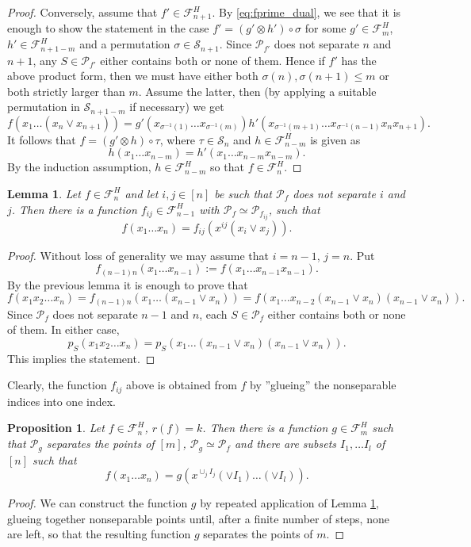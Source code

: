 \documentclass[12pt]{article}
\newtheorem{lemma}{Lemma}
\newtheorem{prop}{Proposition}
\theoremstyle{definition}
\theoremstyle{remark}
\def\perm{\mathcal S}
\def\Pe{\mathcal P}
\def\Fe{\mathcal F}
\begin{document}
\begin{proof}
Conversely, assume that $f'\in \Fe_{n+1}^H$. By \eqref{eq:fprime_dual}, we see that it is
enough to show the statement in the case $f'=(g'\otimes h')\circ \sigma$ for some $g'\in
\Fe_m^H$, $h'\in
\Fe_{n+1-m}^H$ and a permutation $\sigma\in \perm_{n+1}$. Since
$\Pe_{f'}$ does not separate $n$ and $n+1$, any $S\in \Pe_{f'}$
either contains both  or none of them. Hence if $f'$ has the above product form,
then we must have either  both $\sigma(n),\sigma(n+1)\le m$ or both strictly
larger than $m$. Assume the latter, then (by applying a suitable permutation in
$\perm_{n+1-m}$ if
necessary) we get
\[
f(x_1\dots (x_n\vee x_{n+1}))=g'(x_{\sigma^{-1}(1)}\dots
x_{\sigma^{-1}(m)})h'(x_{\sigma^{-1}(m+1)}\dots x_{\sigma^{-1}(n-1)}x_nx_{n+1}).
\]
It follows that $f=(g'\otimes h)\circ \tau$, where $\tau\in \perm_n$ and $h\in \Fe_{n-m}^H$ is
given as
\[
h(x_1\dots x_{n-m})=h'(x_1\dots x_{n-m}x_{n-m}).
\]
By the induction assumption, $h\in \Fe_{n-m}^H$ so that $f\in \Fe_n^H$.


\end{proof}

\begin{lemma}\label{lemma:separateij}
Let $f\in \Fe_n^H$ and let $i,j\in [n]$ be such that $\Pe_f$ does not separate $i$ and
$j$. Then there is a function $f_{ij}\in \Fe_{n-1}^H$ with $\Pe_f\simeq \Pe_{f_{ij}}$, such that 
\[
f(x_1\dots x_n)=f_{ij}(x^{ij}(x_i\vee x_j)).
\]

\end{lemma}

\begin{proof} Without loss of generality we may assume that $i=n-1$, $j=n$. Put 
\[
f_{(n-1)n}(x_1\dots x_{n-1}):=f(x_1\dots x_{n-1}x_{n-1}).
\]
By the previous lemma it is enough to prove that 
\[
f(x_1x_2\dots x_n)=f_{(n-1)n}(x_1\dots (x_{n-1}\vee x_n))=f(x_1\dots x_{n-2}(x_{n-1}\vee
x_n)(x_{n-1}\vee
x_n)).
\]
Since $\Pe_f$ does not separate $n-1$ and $n$, each $S\in \Pe_f$ either contains both or
none of them. In either case,
\[
p_S(x_1x_2\dots x_n)=p_S(x_1\dots (x_{n-1}\vee x_n)(x_{n-1}\vee x_n)).
\]
This implies the statement.


\end{proof}

Clearly, the function $f_{ij}$ above is obtained from $f$ by ''glueing''  the
nonseparable indices into one index.

\begin{prop}\label{prop:separates} Let $f\in \Fe_n^H$, $r(f)=k$. Then there is a function
$g\in \Fe_{m}^H$ such that $\Pe_g$ separates the points of $[m]$, $\Pe_g\simeq \Pe_f$  and there are subsets
$I_1,\dots I_l$ of $[n]$ such that 
\[
f(x_1\dots x_n)=g(x^{\cup_j I_j}(\vee I_1)\dots (\vee I_l)).
\]


\end{prop}
\begin{proof} We can construct the function $g$ by repeated application of Lemma
\ref{lemma:separateij}, glueing together nonseparable points until, after a finite number
of steps, none are left, so that the resulting function $g$ separates the points of $m$.

\end{proof}
\end{document}
